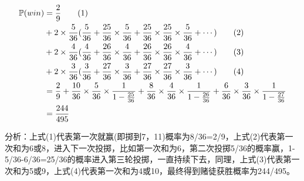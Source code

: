\documentclass[10pt,a4paper]{article}
\begin{document}
\begin{align}
\mathbb{P}(win)
& = \frac{2}{9} \tag{1} \\
& + 2 \times \frac{5}{36}(\frac{5}{36}+\frac{25}{36}\times\frac{5}{36}+\frac{25}{36}\times\frac{25}{36}\times\frac{5}{36}+ \cdots) \tag{2} \\
& + 2 \times \frac{4}{36}(\frac{4}{36}+\frac{26}{36}\times\frac{4}{36}+\frac{26}{36}\times\frac{26}{36}\times\frac{4}{36}+ \cdots) \tag{3} \\
& + 2 \times \frac{3}{36}(\frac{3}{36}+\frac{27}{36}\times\frac{3}{36}+\frac{27}{36}\times\frac{27}{36}\times\frac{3}{36}+ \cdots) \tag{4} \\
& = \frac{2}{9}+\frac{10}{36}\times\frac{5}{36}\times\frac{1}{1-\frac{25}{36}} + \frac{8}{36}\times\frac{4}{36}\times\frac{1}{1-\frac{26}{36}}+\frac{6}{36}\times\frac{3}{36}\times\frac{1}{1-\frac{27}{36}} \notag \\
& = \frac{244}{495} \notag
\end{align}

分析：上式(1)代表第一次就赢(即掷到7，11)概率为8/36=2/9，上式(2)代表第一次和为6或8，进入下一次投掷，比如第一次和为6，第二次投掷5/36的概率赢，1-5/36-6/36=25/36的概率进入第三轮投掷，一直持续下去，同理，上式(3)代表第一次和为5或9，上式(4)代表第一次和为4或10，最终得到赌徒获胜概率为244/495。
\end{document}
